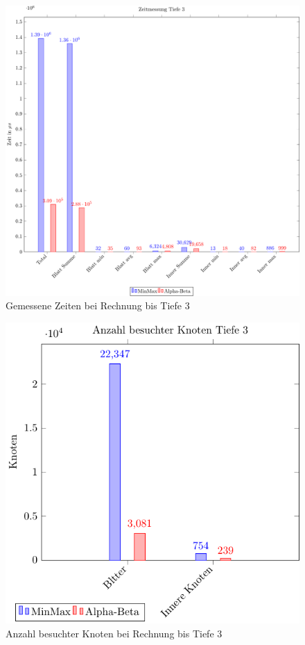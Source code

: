      \begin{figure}[h]
      \centering
      \includegraphics[width=\textwidth]{figures/time-3.pdf} 
      \caption{Gemessene Zeiten bei Rechnung bis Tiefe 3}
      \label{fig:time-3}
    \end{figure}
    \begin{figure}[h]
      \centering
      \includegraphics[width=\textwidth]{figures/node-3.pdf} 
      \caption{Anzahl besuchter Knoten bei Rechnung bis Tiefe 3}
      \label{fig:node-3}
    \end{figure}
